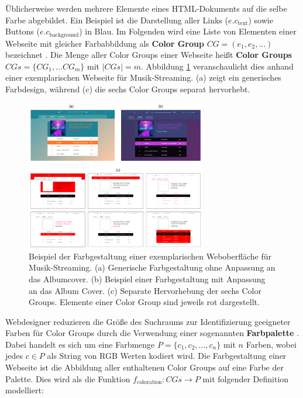 Üblicherweise werden mehrere Elemente eines HTML-Dokuments auf die selbe Farbe abgebildet. Ein Beispiel ist die Darstellung aller Links ($e.c_\text{text}$) sowie Buttons ($e.c_\text{background}$) in Blau. Im Folgenden wird eine Liste von Elementen einer Webseite mit gleicher Farbabbildung als \textbf{Color Group} $CG = (e_1, e_2, ...) $ bezeichnet \citep[siehe auch][]{webpage, patterns}. Die Menge aller Color Groups einer Webseite heißt \textbf{Color Groups} $CGs = \{CG_1, ... CG_m\}$ mit $|CGs| = m$. Abbildung \ref{fig:colorgroups} veranschaulicht dies anhand einer exemplarischen Webseite für Musik-Streaming. (a) zeigt ein generisches Farbdesign, während (c) die sechs Color Groups separat hervorhebt.

\begin{figure}[h]
	\centering
	\includegraphics[width=0.7\textwidth]{img/color_groups.png}
	\caption{Beispiel der Farbgestaltung einer exemplarischen Weboberfläche für Musik-Streaming. (a) Generische Farbgestaltung ohne Anpassung an das Albumcover. (b) Beispiel einer Farbgestaltung mit Anpassung an das Album Cover. (c) Separate Hervorhebung der sechs Color Groups. Elemente einer Color Group sind jeweils rot dargestellt.}
	\label{fig:colorgroups}
\end{figure}

Webdesigner reduzieren die Größe des Suchraums zur Identifizierung geeigneter Farben für Color Groups durch die Verwendung einer sogenannten \textbf{Farbpalette} \citep{webpage, webdesign, webx0}. Dabei handelt es sich um eine Farbmenge $P = \{c_1, c_2, \ldots, c_n\}$ mit $n$ Farben, wobei jedes $c \in P$ als String von RGB Werten kodiert wird. Die Farbgestaltung einer Webseite ist die Abbildung aller enthaltenen Color Groups auf eine Farbe der Palette. Dies wird als die Funktion $f_\text{coloration}: CGs \to P$ mit folgender Definition modelliert:

